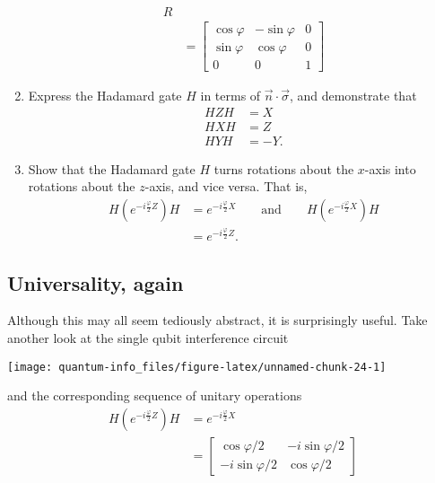 \documentclass{article}
\begin{document}
\begin{enumerate}
\[\begin{aligned}
       R
     \\&= \begin{bmatrix}
         \cos \varphi & -\sin \varphi & 0
       \\\sin \varphi & \cos \varphi & 0
       \\0 & 0 & 1
       \end{bmatrix}
     \end{aligned}
   \]
\item
  Express the Hadamard gate \(H\) in terms of \(\vec{n}\cdot\vec{\sigma}\), and demonstrate that
  \[
     \begin{aligned}
       HZH&=X
     \\HXH&=Z
     \\HYH&=-Y.
     \end{aligned}
   \]
\item
  Show that the Hadamard gate \(H\) turns rotations about the \(x\)-axis into rotations about the \(z\)-axis, and vice versa.
  That is,
  \[
     \begin{aligned}
       H \left(
         e^{-i\frac{\varphi}{2}Z}
       \right) H
       &= e^{-i\frac{\varphi}{2}X}
       \qquad \mbox{and} \qquad
       H \left(
         e^{-i\frac{\varphi}{2}X}
       \right) H
     \\&= e^{-i\frac{\varphi}{2}Z}.
     \end{aligned}
   \]
\end{enumerate}

\hypertarget{universality-again}{%
\subsection{Universality, again}\label{universality-again}}

Although this may all seem tediously abstract, it is surprisingly useful.
Take another look at the single qubit interference circuit

\begin{center}\texttt{[image: quantum-info\_files/figure-latex/unnamed-chunk-24-1]} \end{center}

and the corresponding sequence of unitary operations
\[
  \begin{aligned}
    H \left(
      e^{-i\frac{\varphi}{2}Z}
    \right) H
    &= e^{-i\frac{\varphi}{2}X}
  \\&= \begin{bmatrix}
      \cos\varphi/2 & -i\sin\varphi/2
    \\-i\sin\varphi/2 & \cos\varphi/2
    \end{bmatrix}
  \end{aligned}
\]
\end{document}
